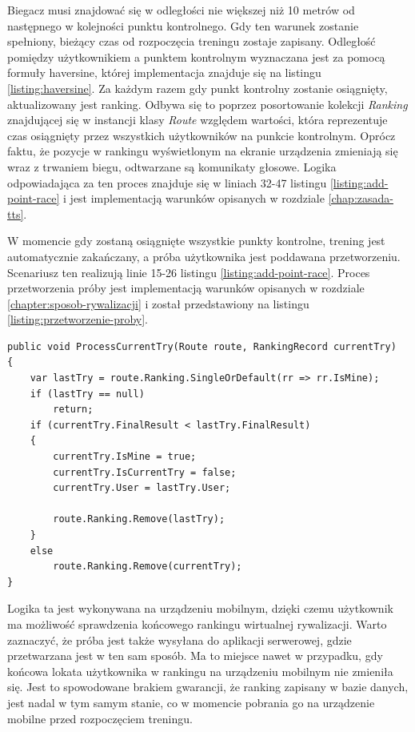 Biegacz musi znajdować się w odległości nie większej niż 10 metrów od następnego w kolejności punktu kontrolnego. Gdy ten warunek zostanie spełniony, bieżący czas od rozpoczęcia treningu zostaje zapisany. Odległość pomiędzy użytkownikiem a punktem kontrolnym wyznaczana jest za pomocą formuły haversine, której implementacja znajduje się na listingu \ref{listing:haversine}. Za każdym razem gdy punkt kontrolny zostanie osiągnięty, aktualizowany jest ranking. Odbywa się to poprzez posortowanie kolekcji \textit{Ranking} znajdującej się w instancji klasy \textit{Route} względem wartości, która reprezentuje czas osiągnięty przez wszystkich użytkowników na punkcie kontrolnym. Oprócz faktu, że pozycje w rankingu wyświetlonym na ekranie urządzenia zmieniają się wraz z trwaniem biegu, odtwarzane są komunikaty głosowe. Logika odpowiadająca za ten proces znajduje się w liniach 32-47 listingu \ref{listing:add-point-race} i jest implementacją warunków opisanych w rozdziale \ref{chap:zasada-tts}.

W momencie gdy zostaną osiągnięte wszystkie punkty kontrolne, trening jest automatycznie zakańczany, a próba użytkownika jest poddawana przetworzeniu. Scenariusz ten realizują linie 15-26 listingu \ref{listing:add-point-race}. Proces przetworzenia próby jest implementacją warunków opisanych w rozdziale \ref{chapter:sposob-rywalizacji} i został przedstawiony na listingu \ref{listing:przetworzenie-proby}.
\begin{lstlisting}[caption={Przetworzenie próby użytkownika},label=listing:przetworzenie-proby]
public void ProcessCurrentTry(Route route, RankingRecord currentTry)
{
    var lastTry = route.Ranking.SingleOrDefault(rr => rr.IsMine);
    if (lastTry == null) 
        return;
    if (currentTry.FinalResult < lastTry.FinalResult)
    {
        currentTry.IsMine = true;
        currentTry.IsCurrentTry = false;
        currentTry.User = lastTry.User;

        route.Ranking.Remove(lastTry);
    }
    else
        route.Ranking.Remove(currentTry);
}
\end{lstlisting}
Logika ta jest wykonywana na urządzeniu mobilnym, dzięki czemu użytkownik ma możliwość sprawdzenia końcowego rankingu wirtualnej rywalizacji. Warto zaznaczyć, że próba jest także wysyłana do aplikacji serwerowej, gdzie przetwarzana jest w ten sam sposób. Ma to miejsce nawet w przypadku, gdy końcowa lokata użytkownika w rankingu na urządzeniu mobilnym nie zmieniła się. Jest to spowodowane brakiem gwarancji, że ranking zapisany w bazie danych, jest nadal w tym samym stanie, co w momencie pobrania go na urządzenie mobilne przed rozpoczęciem treningu.

